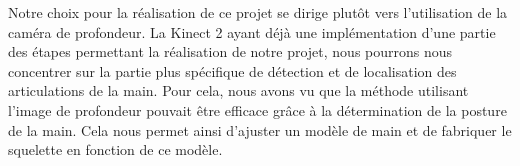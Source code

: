 Notre choix pour la réalisation de ce projet se dirige plutôt vers l'utilisation de la caméra de profondeur.
La Kinect 2 ayant déjà une implémentation d'une partie des étapes permettant la réalisation de notre projet, nous pourrons
nous concentrer sur la partie plus spécifique de détection et de localisation des articulations de la main.
Pour cela, nous avons vu que la méthode utilisant l'image de profondeur pouvait être efficace grâce à la
détermination de la posture de la main. Cela nous permet ainsi d'ajuster un modèle de main et de fabriquer
le squelette en fonction de ce modèle.\\
